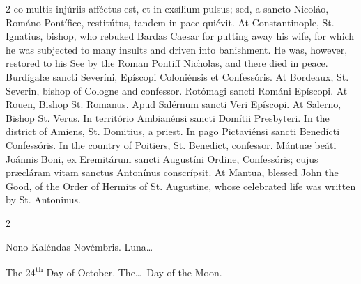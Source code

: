 \begin{paracol}{2}
 eo multis injúriis afféctus est, et in exsílium pulsus; sed, a sancto 
 Nicoláo, Románo Pontífice, restitútus, tandem in pace quiévit.
\switchcolumn
{}
At Constantinople, St. Ignatius, 
 bishop, who rebuked Bardas Caesar for putting away his wife, for which he 
 was subjected to many insults and driven into banishment. He was, 
 however, restored to his See by the Roman Pontiff Nicholas, and there died 
 in peace.
\switchcolumn*
{}
Burdígalæ sancti 
 Severíni, Epíscopi Coloniénsis et Confessóris.
\switchcolumn
{}
At Bordeaux, St. Severin, bishop of 
 Cologne and confessor.
\switchcolumn*
{}
Rotómagi sancti Románi 
 Epíscopi.
\switchcolumn
{}
At Rouen, Bishop St. Romanus.
\switchcolumn*
{}
Apud Salérnum sancti 
 Veri Epíscopi.
\switchcolumn
{}
At Salerno, Bishop St. Verus.
\switchcolumn*
{}
In território Ambianénsi sancti Domítii Presbyteri.
\switchcolumn
{}
In the district of Amiens, St. 
 Domitius, a priest.
\switchcolumn*
{}
In pago Pictaviénsi 
 sancti Benedícti Confessóris.
\switchcolumn
{}
In the country of Poitiers, St. 
 Benedict, confessor.
\switchcolumn*
{}
Mántuæ beáti Joánnis 
 Boni, ex Eremitárum sancti Augustíni Ordine, Confessóris; cujus præcláram 
 vitam sanctus Antonínus conscrípsit.
\switchcolumn
{}
At Mantua, blessed John the Good, of 
 the Order of Hermits of St. Augustine, whose celebrated life was written by 
 St. Antoninus.
\switchcolumn*
{}
\end{paracol}


\begin{paracol}{2}
\begin{center}{\color{gregoriocolor} Nono Kaléndas Novémbris. 
 Luna\dots\ }\end{center}
\switchcolumn
{}
\begin{center}{\color{gregoriocolor} The 
 24\textsuperscript{th} Day of 
 October. The\dots\ Day of the Moon.}\end{center}
\end{paracol}


